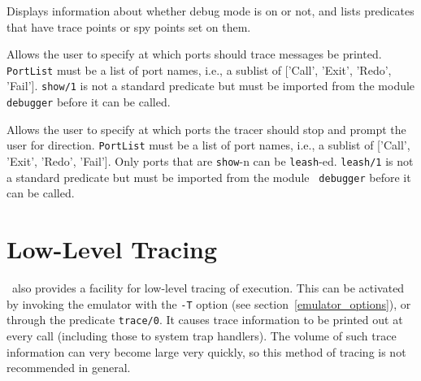 \begin{description}
 
    Displays information about whether debug mode is on or not, and lists
    predicates that have trace points or spy points set on them.

 
    Allows the user to specify at which ports should trace messages be
    printed. {\tt PortList} must be a list of port names, i.e., a sublist
    of ['Call', 'Exit', 'Redo', 'Fail']. {\tt show/1} is not a standard
    predicate but must be imported from the module {\tt debugger} before
    it can be called.

 
    Allows the user to specify at which ports the tracer should stop
    and prompt the user for direction.  {\tt PortList} must be a list of
    port names, i.e., a sublist of ['Call', 'Exit', 'Redo', 'Fail'].  Only
    ports that are {\tt show}-n can be {\tt leash}-ed.  {\tt leash/1} is
    not a standard predicate but must be imported from the module {\tt
    debugger} before it can be called.
\end{description}


\section{Low-Level Tracing}
 

\ourprolog\ also provides a facility for low-level tracing of execution.
This can be activated by invoking the emulator with the {\tt -T} option
(see section~\ref{emulator_options}), or through the predicate {\tt trace/0}.
It causes trace information to be printed out at every call (including
those to system trap handlers).  The volume of such trace information
can very become large very quickly, so this method of tracing is not
recommended in general.


